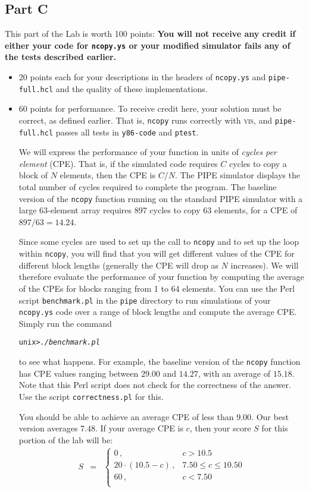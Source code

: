 \documentclass[11pt]{article}
\newenvironment{codefrag}%
{\small\begin{alltt}}%
{\end{alltt}%
}
\begin{document}
\subsection*{Part C}
This part of the Lab is worth 100 points: 
{\bf You will not receive any credit if either your code 
for {\tt ncopy.ys} or your 
modified simulator fails any of the tests described earlier.}
\begin{itemize}
\item 20 points each for 
your descriptions in the headers of \texttt{ncopy.ys} and 
\texttt{pipe-full.hcl} and the quality of these implementations.

\item 60 points for performance. To receive credit here, your
solution must be correct, as defined earlier. That is, \texttt{ncopy}
runs correctly with \textsc{yis}, and \texttt{pipe-full.hcl} passes
all tests in {\tt y86-code} and \texttt{ptest}.

We will express the performance of your function in units of {\em
cycles per element} (CPE).  That is, if the simulated code requires
$C$ cycles to copy a block of $N$ elements, then the CPE is $C/N$.
The PIPE simulator displays the total number of cycles required to
complete the program.  The baseline version of the
\texttt{ncopy} function running on the standard PIPE simulator with a
large 63-element array requires 897 cycles to copy 63 elements, for a
CPE of $897/63 = 14.24$.

Since some cycles are used to set up the call to \texttt{ncopy} and to
set up the loop within \texttt{ncopy}, you will find that you will get
different values of the CPE for different block lengths (generally the
CPE will drop as $N$ increases).  We will therefore evaluate the
performance of your function by computing the average of the CPEs for
blocks ranging from 1 to 64 elements.  You can use the Perl script
\texttt{benchmark.pl} in the {\tt pipe} directory
to run simulations of your {\tt ncopy.ys}
code over a range of block lengths and compute the average CPE\@.
Simply run the command
\begin{codefrag}
unix> {\em ./benchmark.pl}
\end{codefrag}
to see what happens.  For example, the baseline version of the
\texttt{ncopy} function has CPE values ranging between $29.00$ and
$14.27$, with an average of $15.18$.  Note that this Perl script does
not check for the correctness of the answer.  Use the script
\texttt{correctness.pl} for this. 

You should be able to achieve an average CPE of less than $9.00$.
Our best version averages $7.48$.
If your average CPE is $c$, then your score $S$ for this portion of the
lab will be:
\begin{eqnarray*}
S & = & \left \{ \begin{array}{ll}
0\,, &  c > 10.5 \\
20 \cdot (10.5 - c)\,, & 7.50 \leq c \leq 10.50 \\
60\,, &  c < 7.50 \\
\end{array}
\right .
\end{eqnarray*}


\end{itemize}
\end{document}
